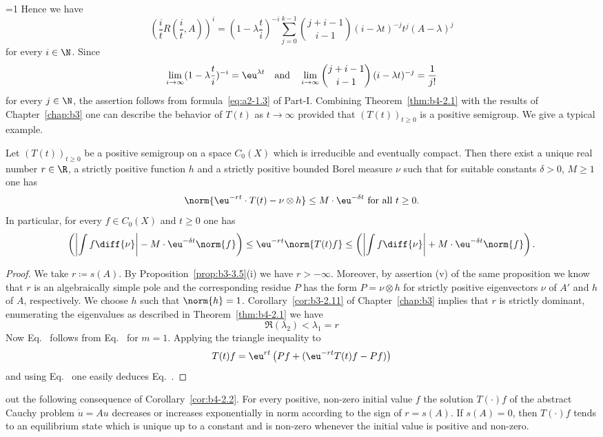 %
=1 
Hence we have
%
\[
	(\frac{i}{t}R(\frac{i}{t},A))^i = (1-\lambda\frac{t}{i})^{-i}\sum_{j=0}^{k-1}\binom{j+i-1}{i-1}(i-\lambda t)^{-j}t^j(A-\lambda)^j 
\]
%
for every $i \in \N$.
Since 
%
\[
	 \lim_{i\to\infty}(1-\lambda\frac{t}{i})^{-i} = \eu^{\lambda t}
	 \quad \text{and} \quad \lim_{i\to\infty}\binom{j+i-1}{i-1}\,(i-\lambda t)^{-j} = \frac{1}{j!}
\]
%
for every $j \in \N$, the assertion follows from 
formula~\eqref{eq:a2-1.3} of Part-I.
\fi
Combining Theorem~\ref{thm:b4-2.1} with the results of Chapter~\ref{chap:b3} one can describe
the behavior of\/ $T(t)$ as $t \to \infty$ provided that $(T(t))_{t \geq 0}$ is a positive semigroup.
We give a typical example.

\begin{corollary}\label{cor:b4-2.2}
	Let $(T(t))_{t \geq 0}$ be a positive semigroup on a space
	$C_{0}(X)$ which is irreducible and eventually compact.
	Then there exist a
	unique real number $r \in \R$, a strictly positive function $h$ and a
	strictly positive bounded Borel measure $\nu$ such that for suitable
	constants $\delta > 0$, $M \geq 1$ one has
	\begin{equation}\label{eq:b4-2.2}
		\norm{\eu^{-rt}\cdot T(t) - \nu\otimes h} \leq M\cdot \eu^{-\delta t} \text{ for all } t \geq 0 .
	\end{equation}
	In particular, for every $f \in C_{0}(X)$ and $t \geq 0$ one has
	\begin{equation}\label{eq:b4-2.3} 
		\left(\left|\int f \diff{\nu}\right| - M\cdot \eu^{-\delta t}\norm{f}\right) \leq \eu^{-rt}\norm{T(t)f} \leq \left(\left|\int f \diff{\nu}\right| + M\cdot \eu^{-\delta t}\norm{f}\right).
	\end{equation}
\end{corollary}
\begin{proof}
	We take $r  \coloneq  s(A)$.
	By Proposition~\ref{prop:b3-3.5}(i) we have $r > -\infty$.
	Moreover, by assertion (v) of the same proposition we know that $r$ is
	an algebraically simple pole and the corresponding residue $P$ has the
	form $P = \nu \otimes h$ for strictly positive eigenvectors $\nu$ of\/ $A'$
	and $h$ of\/ $A$, respectively.
    We choose $h$ such that 
	$\norm{h} = 1$.
	Corollary~\ref{cor:b3-2.11} of Chapter~\ref{chap:b3} implies that $r$ is strictly
	dominant, \ie enumerating the eigenvalues as described in Theorem~\ref{thm:b4-2.1} we
	have 
\[
	\Re(\lambda_2) < \lambda_1 = r 
\]
Now Eq.~ follows from Eq.~ for $m = 1$.
Applying the triangle inequality to %
\[
	 T(t)f = \eu^{rt}\left(Pf + (\eu^{-rt}T(t)f-Pf)\right) 
\]
%
and using Eq.~ one easily deduces Eq.~.
\end{proof}
 out the following consequence of Corollary~\ref{cor:b4-2.2}.
For every positive, non-zero initial value $f$ the solution $T(\cdot)f$
of the abstract Cauchy problem $\dot{u} = Au$ decreases or increases
exponentially in norm according to the sign of\/ $r = s(A)$.
If\/ $s(A) = 0$, then $T(\cdot)f$ tends to an equilibrium state which is
unique up to a constant and is non-zero whenever the initial value is
positive and non-zero.


